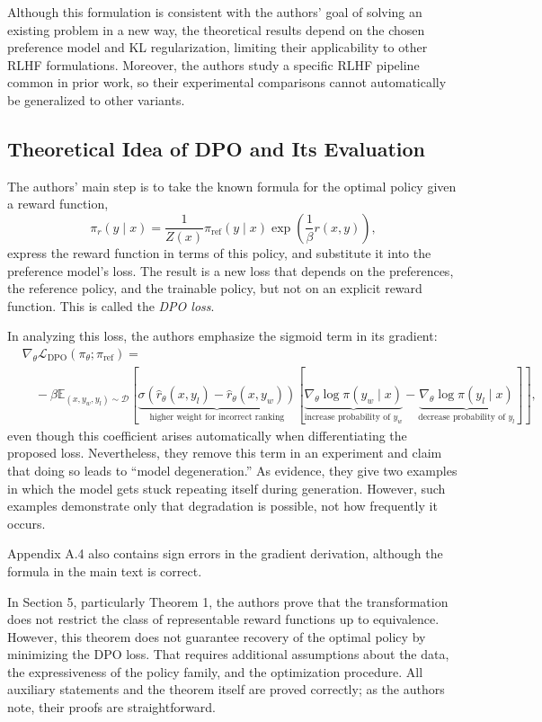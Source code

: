 \documentclass[11pt,a4paper]{article}
\theoremstyle{remark}
\begin{document}
Although this formulation is consistent with the authors' goal of solving an existing problem in a new way, the theoretical results depend on the chosen preference model and KL regularization, limiting their applicability to other RLHF formulations. Moreover, the authors study a specific RLHF pipeline common in prior work, so their experimental comparisons cannot automatically be generalized to other variants.

\subsection{Theoretical Idea of DPO and Its Evaluation}

The authors' main step is to take the known formula for the optimal policy given a reward function,
\[\pi_r(y \mid x) = \frac{1}{Z(x)} \pi_{\text{ref}}(y \mid x) \exp \left( \frac{1}{\beta} r(x, y) \right),\]
express the reward function in terms of this policy, and substitute it into the preference model's loss. The result is a new loss that depends on the preferences, the reference policy, and the trainable policy, but not on an explicit reward function. This is called the \textit{DPO loss}.

In analyzing this loss, the authors emphasize the sigmoid term in its gradient:
\[\begin{aligned}
& \nabla_\theta \mathcal{L}_{\text{DPO}}(\pi_\theta; \pi_{\text{ref}}) = \\
& \quad - \beta \mathbb{E}_{(x, y_w, y_l) \sim \mathcal{D}} \left[ \underbrace{\sigma(\hat{r}_\theta(x, y_l) - \hat{r}_\theta(x, y_w))}_{\text{higher weight for incorrect ranking}} \left[ \underbrace{\nabla_\theta \log \pi(y_w \mid x)}_{\text{increase probability of } y_w} - \underbrace{\nabla_\theta \log \pi(y_l \mid x)}_{\text{decrease probability of } y_l} \right] \right],
\end{aligned}\]
even though this coefficient arises automatically when differentiating the proposed loss. Nevertheless, they remove this term in an experiment and claim that doing so leads to ``model degeneration.'' As evidence, they give two examples in which the model gets stuck repeating itself during generation. However, such examples demonstrate only that degradation is possible, not how frequently it occurs.

Appendix A.4 also contains sign errors in the gradient derivation, although the formula in the main text is correct.

In Section 5, particularly Theorem 1, the authors prove that the transformation does not restrict the class of representable reward functions up to equivalence. However, this theorem does not guarantee recovery of the optimal policy by minimizing the DPO loss. That requires additional assumptions about the data, the expressiveness of the policy family, and the optimization procedure.
All auxiliary statements and the theorem itself are proved correctly; as the authors note, their proofs are straightforward.
\end{document}
